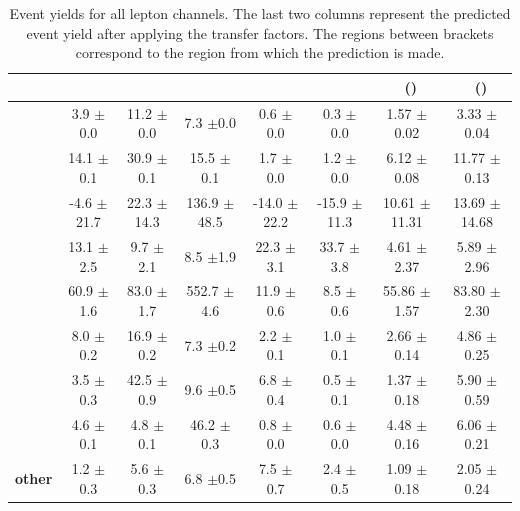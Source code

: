 \begin{landscape}
	\vspace*{\fill}
	\begin{table}[htb!]
	\begin{center}
				\caption{Event yields for all lepton channels. The last two columns represent the predicted event yield after applying the transfer factors. The regions between brackets correspond to the region from which the prediction is made.}
		
		\begin{tabular} {l ccccc|cc}
			\toprule
			& \STSR & \TTSR & \WZCR & \TTCR & \STCR & \STSR\ (\WZCR) & \TTSR\ (\WZCR)  \\ 
			\midrule 
			\textbf{\kZut} & 3.9 $\pm $0.0 & 11.2 $\pm $0.0 & 7.3 $\pm $0.0 & 0.6 $\pm $0.0 & 0.3 $\pm $0.0 & 1.57 $\pm $0.02 & 3.33 $\pm $0.04 \\ 
			\textbf{\kZct} & 14.1 $\pm $0.1 & 30.9 $\pm $0.1 & 15.5 $\pm $0.1 & 1.7 $\pm $0.0 & 1.2 $\pm $0.0 & 6.12 $\pm $0.08 & 11.77 $\pm $0.13 \\ 
			\textbf{\DY } & -4.6 $\pm $21.7 & 22.3 $\pm $14.3 & 136.9 $\pm $48.5 & -14.0 $\pm $22.2 & -15.9 $\pm $11.3 & 10.61 $\pm $11.31 & 13.69 $\pm $14.68 \\ 
			\textbf{\ttbar} & 13.1 $\pm $2.5 & 9.7 $\pm $2.1 & 8.5 $\pm $1.9 & 22.3 $\pm $3.1 & 33.7 $\pm $3.8 & 4.61 $\pm $2.37 & 5.89 $\pm $2.96  \\  
			\textbf{\WZ} & 60.9 $\pm $1.6 & 83.0 $\pm $1.7 & 552.7 $\pm $4.6 & 11.9 $\pm $0.6 & 8.5 $\pm $0.6 & 55.86 $\pm $1.57 & 83.80 $\pm $2.30 \\ 
			\textbf{\tZq} & 8.0 $\pm $0.2 & 16.9 $\pm $0.2 & 7.3 $\pm $0.2 & 2.2 $\pm $0.1 & 1.0 $\pm $0.1 & 2.66 $\pm $0.14 & 4.86 $\pm $0.25 \\ 
			\textbf{\ttZ} & 3.5 $\pm $0.3 & 42.5 $\pm $0.9 & 9.6 $\pm $0.5 & 6.8 $\pm $0.4 & 0.5 $\pm $0.1 & 1.37 $\pm $0.18 & 5.90 $\pm $0.59 \\ 
			\textbf{\ZZ} & 4.6 $\pm $0.1 & 4.8 $\pm $0.1 & 46.2 $\pm $0.3 & 0.8 $\pm $0.0 & 0.6 $\pm $0.0 & 4.48 $\pm $0.16 & 6.06 $\pm $0.21 \\ 
			\textbf{other} & 1.2 $\pm $0.3 & 5.6 $\pm $0.3 & 6.8 $\pm $0.5 & 7.5 $\pm $0.7 & 2.4 $\pm $0.5 & 1.09 $\pm $0.18 & 2.05 $\pm $0.24 \\ 
			\bottomrule
		\end{tabular}
	\end{center}
\end{table}
\vspace*{\fill}
\end{landscape}
\clearpage
